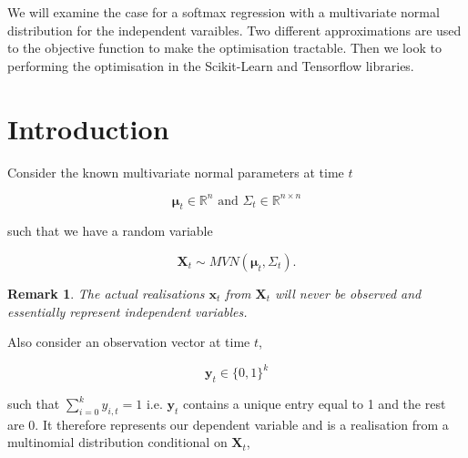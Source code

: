 \documentclass[
10pt, %
a4paper, %
oneside, %
headinclude,footinclude, %
BCOR5mm, %
]{scrartcl}
\newcommand{\bfmu}{\boldsymbol{\mu}}
\newcommand{\bfX}{\boldsymbol{X}}
\newcommand{\bfx}{\boldsymbol{x}}
\newcommand{\bfy}{\boldsymbol{y}}
\newtheorem{remark}{Remark}
\begin{document}
We will examine the case for a softmax regression with a multivariate normal distribution for the independent varaibles. Two different approximations are used to the objective function to make the optimisation tractable. Then we look to performing the optimisation in the Scikit-Learn and Tensorflow libraries.


\let\thefootnote\relax{}

\let\thefootnote\relax{}


\newpage %


\section{Introduction}

Consider the known multivariate normal parameters at time $t$

$$ \bfmu_t \in \mathbb{R}^n \mbox{ and } \Sigma_t \in \mathbb{R}^{n \times n} $$

such that we have a random variable

$$ \bfX_t \sim MVN(\bfmu_t, \Sigma_t). $$

\begin{remark}
The actual realisations $\bfx_t$ from $\bfX_t$ will never be observed and essentially represent independent variables.
\end{remark}

Also consider an observation vector at time $t$,

$$ \bfy_t \in \{0,1\}^k $$

such that $\sum_{i=0}^k y_{i,t} = 1$ i.e. $\bfy_t$ contains a unique entry equal to 1 and the rest are 0. It therefore represents our dependent variable and is a realisation from a multinomial distribution conditional on $\bfX_t$,
\end{document}
